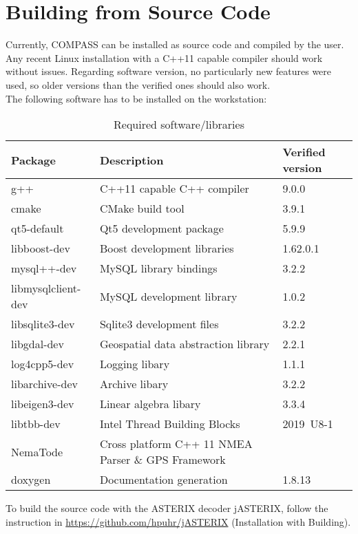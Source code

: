 \section{Building from Source Code}
Currently, COMPASS can be installed as source code and compiled by the user. Any recent Linux installation with a C++11 capable compiler should work without issues. Regarding software version, no particularly new features were used, so older versions than the verified ones should also work. \\

The following software has to be installed on the workstation:

\begin{table}[H]
  \center
  \begin{tabular}{ | l | l | l |}
    \hline
    \textbf{Package} & \textbf{Description} & \textbf{Verified version} \\ \hline
    g++ & C++11 capable C++ compiler & 9.0.0 \\ \hline
    cmake & CMake build tool & 3.9.1 \\ \hline
    qt5-default & Qt5 development package & 5.9.9 \\ \hline
    libboost-dev & Boost development libraries & 1.62.0.1 \\ \hline
    mysql++-dev & MySQL library bindings & 3.2.2 \\ \hline
    libmysqlclient-dev & MySQL development library & 1.0.2 \\ \hline
    libsqlite3-dev & Sqlite3 development files & 3.2.2 \\ \hline
    libgdal-dev & Geospatial data abstraction library & 2.2.1 \\ \hline
    log4cpp5-dev & Logging libary & 1.1.1 \\ \hline
    libarchive-dev & Archive libary & 3.2.2 \\ \hline
    libeigen3-dev & Linear algebra libary & 3.3.4 \\ \hline
    libtbb-dev & Intel Thread Building Blocks & 2019~U8-1 \\ \hline
    NemaTode & Cross platform C++ 11 NMEA Parser \& GPS Framework & \\ \hline
    doxygen & Documentation generation & 1.8.13 \\ 
    \hline
  \end{tabular}
  \caption{Required software/libraries}
\end{table}

To build the source code with the ASTERIX decoder jASTERIX, follow the instruction in \url{https://github.com/hpuhr/jASTERIX} (Installation with Building). \\

